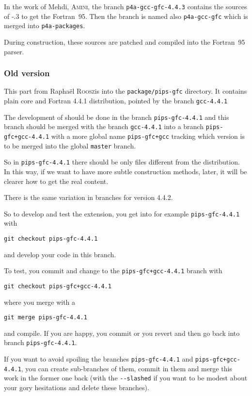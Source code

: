 \documentclass[a4paper]{article}
\begin{document}
In the work of Mehdi, \textsc{Amini}, the branch
\texttt{p4a-gcc-gfc-4.4.3} contains the sources of \Agcc-.3 to
get the Fortran~95. Then the branch is named also \texttt{p4a-gcc-gfc}
which is merged into \texttt{p4a-packages}.

During \Apfa construction, these sources are patched and compiled into the
\Apips Fortran~95 parser.


\subsubsection{Old version}
\label{sec:old-version}


This part from Raphaël \textsc{Roosz}is into the \texttt{package/pips-gfc}
directory. It contains plain \Agcc core and Fortran 4.4.1 distribution,
pointed by the branch \texttt{gcc-4.4.1}

The development of \Apipsgfc should be done in the branch
\texttt{pips-gfc-4.4.1} and this branch should be merged with the
branch \texttt{gcc-4.4.1} into a branch \texttt{pips-gfc+gcc-4.4.1} with a
more global name \texttt{pips-gfc+gcc} tracking which version is to be
merged into the global \texttt{master} branch.

So in \texttt{pips-gfc-4.4.1} there should be only files different from
the \Agcc distribution. In this way, if we want to have more subtle
construction methods, later, it will be clearer how to get the real
content.

There is the same variation in branches for version 4.4.2.

So to develop and test the \Apipsgfc extension, you get into for example
\texttt{pips-gfc-4.4.1} with
\begin{verbatim}
git checkout pips-gfc-4.4.1
\end{verbatim}
and develop your code in this branch.

To test, you commit and change to the \texttt{pips-gfc+gcc-4.4.1} branch with
\begin{verbatim}
git checkout pips-gfc+gcc-4.4.1
\end{verbatim}
where you merge with a
\begin{verbatim}
git merge pips-gfc-4.4.1
\end{verbatim}
and compile. If you are happy, you commit or you revert and then go back
into branch \texttt{pips-gfc-4.4.1}.

If you want to avoid spoiling the branches \texttt{pips-gfc-4.4.1} and
\texttt{pips-gfc+gcc-4.4.1}, you can create sub-branches of them, commit in
them and merge this work in the former one back (with the \verb|--slashed|
if you want to be modest about your gory hesitations \smiley{} and delete
these branches).
\end{document}
